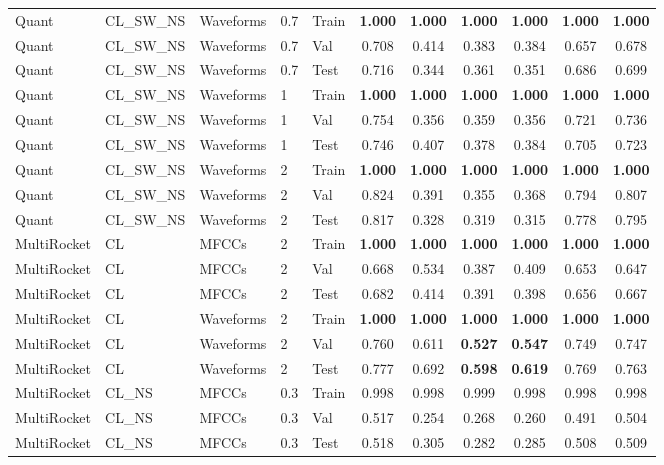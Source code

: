 \begin{landscape}
\begin{longtable}{|l|l|l|l|l|c|c|c|c|c|c|}
Quant & CL\_SW\_NS & Waveforms & 0.7 & Train & \textbf{1.000} & \textbf{1.000} & \textbf{1.000} & \textbf{1.000} & \textbf{1.000} & \textbf{1.000} \\
Quant & CL\_SW\_NS & Waveforms & 0.7 & Val & 0.708 & 0.414 & 0.383 & 0.384 & 0.657 & 0.678 \\
Quant & CL\_SW\_NS & Waveforms & 0.7 & Test & 0.716 & 0.344 & 0.361 & 0.351 & 0.686 & 0.699 \\
Quant & CL\_SW\_NS & Waveforms & 1 & Train & \textbf{1.000} & \textbf{1.000} & \textbf{1.000} & \textbf{1.000} & \textbf{1.000} & \textbf{1.000} \\
Quant & CL\_SW\_NS & Waveforms & 1 & Val & 0.754 & 0.356 & 0.359 & 0.356 & 0.721 & 0.736 \\
Quant & CL\_SW\_NS & Waveforms & 1 & Test & 0.746 & 0.407 & 0.378 & 0.384 & 0.705 & 0.723 \\
Quant & CL\_SW\_NS & Waveforms & 2 & Train & \textbf{1.000} & \textbf{1.000} & \textbf{1.000} & \textbf{1.000} & \textbf{1.000} & \textbf{1.000} \\
Quant & CL\_SW\_NS & Waveforms & 2 & Val & 0.824 & 0.391 & 0.355 & 0.368 & 0.794 & 0.807 \\
Quant & CL\_SW\_NS & Waveforms & 2 & Test & 0.817 & 0.328 & 0.319 & 0.315 & 0.778 & 0.795 \\
MultiRocket & CL & MFCCs & 2 & Train & \textbf{1.000} & \textbf{1.000} & \textbf{1.000} & \textbf{1.000} & \textbf{1.000} & \textbf{1.000} \\
MultiRocket & CL & MFCCs & 2 & Val & 0.668 & 0.534 & 0.387 & 0.409 & 0.653 & 0.647 \\
MultiRocket & CL & MFCCs & 2 & Test & 0.682 & 0.414 & 0.391 & 0.398 & 0.656 & 0.667 \\
MultiRocket & CL & Waveforms & 2 & Train & \textbf{1.000} & \textbf{1.000} & \textbf{1.000} & \textbf{1.000} & \textbf{1.000} & \textbf{1.000} \\
MultiRocket & CL & Waveforms & 2 & Val & 0.760 & 0.611 & \textbf{0.527} & \textbf{0.547} & 0.749 & 0.747 \\
MultiRocket & CL & Waveforms & 2 & Test & 0.777 & 0.692 & \textbf{0.598} & \textbf{0.619} & 0.769 & 0.763 \\
MultiRocket & CL\_NS & MFCCs & 0.3 & Train & 0.998 & 0.998 & 0.999 & 0.998 & 0.998 & 0.998 \\
MultiRocket & CL\_NS & MFCCs & 0.3 & Val & 0.517 & 0.254 & 0.268 & 0.260 & 0.491 & 0.504 \\
MultiRocket & CL\_NS & MFCCs & 0.3 & Test & 0.518 & 0.305 & 0.282 & 0.285 & 0.508 & 0.509 \\

\end{longtable}
\end{landscape}
